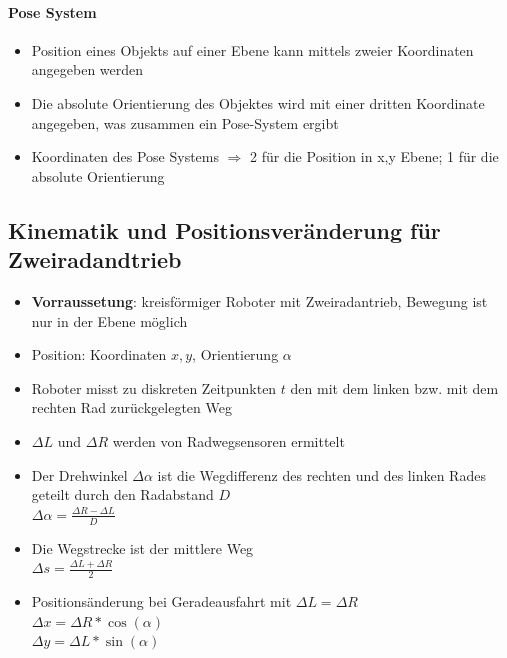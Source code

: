 \paragraph{Pose System}
\begin{itemize}
	\item Position eines Objekts auf einer Ebene kann mittels zweier Koordinaten angegeben werden
	\item Die absolute Orientierung des Objektes wird mit einer dritten Koordinate angegeben, was zusammen ein Pose-System ergibt
	\item Koordinaten des Pose Systems $\Rightarrow$ 2 für die Position in x,y Ebene; 1 für die absolute Orientierung
\end{itemize}
\subsection{Kinematik und Positionsveränderung für Zweiradandtrieb}
\begin{itemize}
	\item \textbf{Vorraussetung}: kreisförmiger Roboter mit Zweiradantrieb, Bewegung ist nur in der Ebene möglich
	\item Position: Koordinaten $x,y$, Orientierung $\alpha$
	\item Roboter misst zu diskreten Zeitpunkten $t$ den mit dem linken bzw. mit dem rechten Rad zurückgelegten Weg
	\item $\Delta L$ und $\Delta R$ werden von Radwegsensoren ermittelt
\end{itemize}
\begin{itemize}
	\item Der Drehwinkel $\Delta \alpha$ ist die Wegdifferenz des rechten und des linken Rades geteilt durch den Radabstand $D$ \\
	$\Delta \alpha=\frac{\Delta R-\Delta L}{D}$
	\item Die Wegstrecke ist der mittlere Weg \\
	$\Delta s=\frac{\Delta L+\Delta R}{2}$
	\item Positionsänderung bei Geradeausfahrt mit $\Delta L = \Delta R$ \\
	$\Delta x=\Delta R * \cos (\alpha)$ \\
	$\Delta y=\Delta L * \sin (\alpha)$
\end{itemize}
